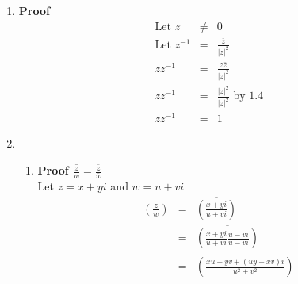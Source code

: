\documentclass{article}%
\newcommand\abs[1]{\left|#1\right|}
\newenvironment{proof}[1][]{\begin{samepage}\textbf{Proof #1} }{\end{samepage}}
\begin{document}
\begin{enumerate}
\begin{enumerate}[label*=\arabic*.]
\begin{enumerate}[label=\alph*]
\begin{proof}[$\abs{zw}=\abs{z}\abs{w}$]
            \end{proof}
            \item
            \begin{proof}[$\abs{z}=\abs{\overline{z}}$]
                \\ Let $z=x+yi$
                \begin{eqnarray*}
                    \abs{z}&=&\abs{x+yi} \\
                           &=&\sqrt{x^2+y^2} \\
                    \abs{\overline{z}}&=&\abs{\overline{x+yi}} \\
                                      &=&\abs{x-yi} \\
                                      &=&\sqrt{x^2+y^2} \\
                    \abs{z}&=&\abs{\overline{z}} 
                \end{eqnarray*}
            \end{proof}
        \end{enumerate}
        \item 
        \begin{proof}
            \begin{eqnarray*}
                \text{Let } z&\neq&0 \\
                \text{Let } z^{-1}&=&\frac{\overline{z}}{\abs{z}^2} \\
                z z^{-1}&=&\frac{z\overline{z}}{\abs{z}^2} \\
                z z^{-1}&=&\frac{\abs{z}^2}{\abs{z}^2} \text{ by 1.4} \\
                z z^{-1}&=&1
            \end{eqnarray*}
        \end{proof}
        \item
        \begin{enumerate}[label=\alph*]
            \item
            \begin{proof}[$\overline{\frac{z}{w}}=\frac{\bar{z}}{\bar{w}}$]
                \\ Let $z=x+yi$ and $w=u+vi$
                \begin{eqnarray*}
                    \overline{(\frac{z}{w})}&=&\overline{(\frac{x+yi}{u+vi})} \\
                                            &=&\overline{(\frac{x+yi}{u+vi}\frac{u-vi}{u-vi})} \\
                                            &=&\overline{(\frac{xu+yv+(uy-xv)i}{u^2+v^2})} \\

\end{eqnarray*}
\end{proof}
\end{enumerate}
\end{enumerate}
\end{enumerate}
\end{document}
